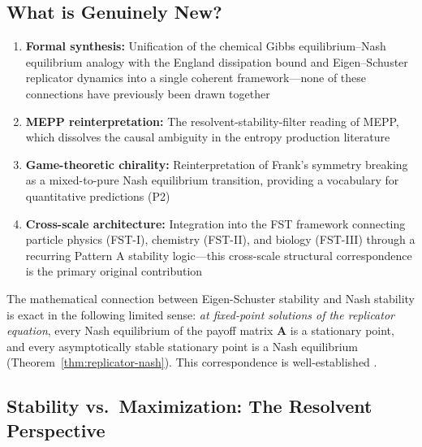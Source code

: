 \documentclass[12pt,a4paper]{article}
\theoremstyle{remark}
\begin{document}
\subsection{What is Genuinely New?}

\begin{enumerate}
    \item \textbf{Formal synthesis:} Unification of the chemical Gibbs equilibrium--Nash equilibrium analogy \citep{MetabolicNash} with the England dissipation bound \citep{England2013} and Eigen--Schuster replicator dynamics \citep{Eigen1979} into a single coherent framework---none of these connections have previously been drawn together
    \item \textbf{MEPP reinterpretation:} The resolvent-stability-filter reading of MEPP, which dissolves the causal ambiguity in the entropy production literature
    \item \textbf{Game-theoretic chirality:} Reinterpretation of Frank's symmetry breaking \citep{Frank1953} as a mixed-to-pure Nash equilibrium transition, providing a vocabulary for quantitative predictions (P2)
    \item \textbf{Cross-scale architecture:} Integration into the FST framework connecting particle physics (FST-I), chemistry (FST-II), and biology (FST-III) through a recurring Pattern A stability logic---this cross-scale structural correspondence is the primary original contribution
\end{enumerate}

The mathematical connection between Eigen-Schuster stability and Nash stability is exact in the following limited sense: \emph{at fixed-point solutions of the replicator equation}, every Nash equilibrium of the payoff matrix $\mathbf{A}$ is a stationary point, and every asymptotically stable stationary point is a Nash equilibrium (Theorem~\ref{thm:replicator-nash}). This correspondence is well-established \citep{HofbauerSigmund2003}.

\subsection{Stability vs.\ Maximization: The Resolvent Perspective}
\end{document}
